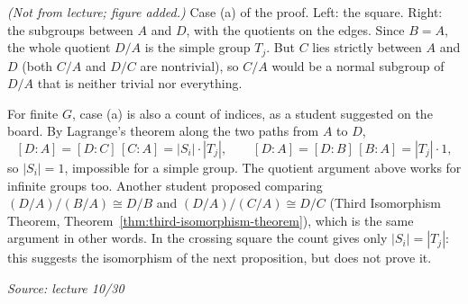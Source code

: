 \documentclass[11pt]{report}
\newcommand{\srcline}[1]{\par\hfill{\footnotesize\textit{Source: #1}}}
\begin{document}
\begin{center}
\end{center}

\textit{(Not from lecture; figure added.)} Case (a) of the proof. Left: the square. Right: the subgroups between $A$ and $D$, with the quotients on the edges. Since $B = A$, the whole quotient $D/A$ is the simple group $T_j$. But $C$ lies strictly between $A$ and $D$ (both $C/A$ and $D/C$ are nontrivial), so $C/A$ would be a normal subgroup of $D/A$ that is neither trivial nor everything.

\begin{rembox}\label{rem:jh-counting}
For finite $G$, case (a) is also a count of indices, as a student suggested on the board. By Lagrange's theorem along the two paths from $A$ to $D$,
\[ [D : A] = [D : C]\,[C : A] = |S_i| \cdot |T_j|, \qquad [D : A] = [D : B]\,[B : A] = |T_j| \cdot 1, \]
so $|S_i| = 1$, impossible for a simple group. The quotient argument above works for infinite groups too. Another student proposed comparing $(D/A)/(B/A) \cong D/B$ and $(D/A)/(C/A) \cong D/C$ (Third Isomorphism Theorem, Theorem~\ref{thm:third-isomorphism-theorem}), which is the same argument in other words. In the crossing square the count gives only $|S_i| = |T_j|$: this suggests the isomorphism of the next proposition, but does not prove it.
\srcline{lecture 10/30}
\end{rembox}
\end{document}
